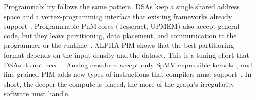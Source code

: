 \documentclass[journal,onecolumn]{IEEEtran}
\begin{document}
Programmability follows the same pattern. DSAs keep a single shared address space and a vertex-programming interface that existing frameworks already support~\cite{ham2016graphicionado}. Programmable PnM cores (Tesseract, UPMEM) also accept general code, but they leave partitioning, data placement, and communication to the programmer or the runtime~\cite{ahn2015tesseract,cai2024pimpam,barkhordar2025alphapim}. ALPHA-PIM shows that the best partitioning format depends on the input density and the dataset. This is a tuning effort that DSAs do not need~\cite{barkhordar2025alphapim}. Analog crossbars accept only SpMV-expressible kernels~\cite{song2018graphr}, and fine-grained PIM adds new types of instructions that compilers must support~\cite{yenimol2026cograf}. In short, the deeper the compute is placed, the more of the graph's irregularity software must handle.
\end{document}
